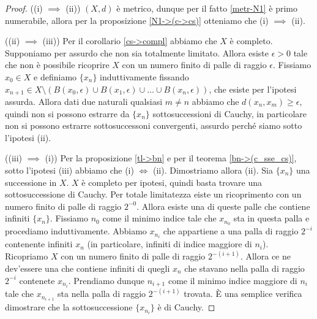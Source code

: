 \begin{proof}
  ((i) $\implies$ (ii)) $(X, d)$ è metrico, dunque per il fatto \ref{metr-N1} è primo numerabile, allora per la proposizione \ref{N1->(c->cs)} otteniamo che (i) $\implies$ (ii).

  ((ii) $\implies$ (iii)) Per il corollario \ref{cs->compl} abbiamo che $X$ è completo. Supponiamo per assurdo che non sia totalmente limitato. Allora esiste $\epsilon>0$ tale che non è possibile ricoprire $X$ con un numero finito di palle di raggio $\epsilon$. Fissiamo $x_0 \in X$ e definiamo $\{x_n\}$ induttivamente fissando $x_{n+1} \in X \setminus (B(x_0, \epsilon) \cup B(x_1, \epsilon) \cup \dots \cup B(x_n, \epsilon))$, che esiste per l'ipotesi assurda.
  Allora dati due naturali qualsiasi $m \not= n$ abbiamo che $d(x_n, x_m) \ge \epsilon$, quindi non si possono estrarre da $\{x_n\}$ sottosuccessioni di Cauchy, in particolare non si possono estrarre sottosuccessoni convergenti, assurdo perché siamo sotto l'ipotesi (ii).

  ((iii) $\implies$ (i)) Per la proposizione \ref{tl->bn} e per il teorema \ref{bn->(c_sse_cs)}, sotto l'ipotesi (iii) abbiamo che (i) $\Leftrightarrow$ (ii). Dimostriamo allora (ii). Sia $\{x_n\}$ una successione in $X$. $X$ è completo per ipotesi, quindi basta trovare una sottosuccessione di Cauchy.
  Per totale limitatezza eiste un ricoprimento con un numero finito di palle di raggio $2^{-0}$. Allora esiste una di queste palle che contiene infiniti $\{x_n\}$. Fissiamo $n_0$ come il minimo indice tale che $x_{n_0}$ sta in questa palla e procediamo induttivamente.
  Abbiamo $x_{n_i}$ che appartiene a una palla di raggio $2^{-i}$ contenente infiniti $x_n$ (in particolare, infiniti di indice maggiore di $n_i$). Ricopriamo $X$ con un numero finito di palle di raggio $2^{-(i+1)}$. Allora ce ne dev'essere una che contiene infiniti di quegli $x_n$ che stavano nella palla di raggio $2^{-i}$ contenete $x_{n_i}$. Prendiamo dunque $n_{i+1}$ come il minimo indice maggiore di $n_i$ tale che $x_{n_{i+1}}$ sta nella palla di raggio $2^{-(i+1)}$ trovata. È una semplice verifica dimostrare che la sottosuccessione $\{x_{n_i}\}$ è di Cauchy.
\end{proof}

